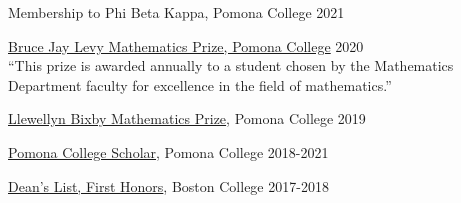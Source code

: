 \documentclass[margin,line]{res}
\begin{document}
\begin{resume}
\vspace*{-2mm}
Membership to Phi Beta Kappa, Pomona College  \hfill 2021

\vspace*{-2mm}
\href{https://www.pomona.edu/students/academic-awards-and-distinctions#:~:text=The%20Bruce%20Jay%20Levy%20Prize,in%20the%20field%20of%20mathematics.}{{\color{Maroon} Bruce Jay Levy Mathematics Prize, Pomona College}} \hfill 2020\\
{\color{gray} ``This prize is awarded annually to a student chosen by the Mathematics Department faculty for excellence in the field of mathematics.''}
 
\vspace*{-2mm}
\href{https://www.pomona.edu/students/academic-awards-and-distinctions#:~:text=The%20Llewellyn%20Bixby%20Mathematics%20Prize,the%20second%20year%20of%20mathematics.}{Llewellyn Bixby Mathematics Prize}, Pomona College  \hfill 2019
  
\vspace*{-2mm}
\href{https://www.pomona.edu/administration/registrar/reports-statistics/pomona-college-scholars}{Pomona College Scholar}, Pomona College  \hfill 2018-2021
  
\vspace*{-2mm}
\href{https://www.bc.edu/bc-web/academics/sites/university-catalog/policies-procedures/undergraduate-academic-regulations.html#tab-dean_s_list}{Dean's List, First Honors}, Boston College  \hfill 2017-2018   
  

\end{resume}
\end{document}
